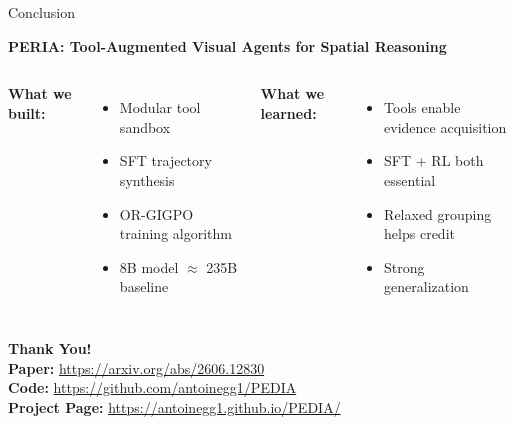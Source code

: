 \documentclass[aspectratio=169,xcolor=dvipsnames]{beamer}
\begin{document}
\begin{frame}{Conclusion}
\begin{center}
\Large
\textbf{PERIA: Tool-Augmented Visual Agents for Spatial Reasoning}
\end{center}

\vspace{1em}

\begin{columns}[c]
\textbf{What we built:}
\begin{itemize}
    \item Modular tool sandbox
    \item SFT trajectory synthesis
    \item OR-GIGPO training algorithm
    \item 8B model $\approx$ 235B baseline
\end{itemize}

\textbf{What we learned:}
\begin{itemize}
    \item Tools enable evidence acquisition
    \item SFT + RL both essential
    \item Relaxed grouping helps credit
    \item Strong generalization
\end{itemize}
\end{columns}

\vspace{2em}

\begin{center}
\Large
\textbf{Thank You!}\\[1em]
\normalsize
\textbf{Paper:} \url{https://arxiv.org/abs/2606.12830}\\
\textbf{Code:} \url{https://github.com/antoinegg1/PEDIA}\\
\textbf{Project Page:} \url{https://antoinegg1.github.io/PEDIA/}
\end{center}
\end{frame}
\end{document}
